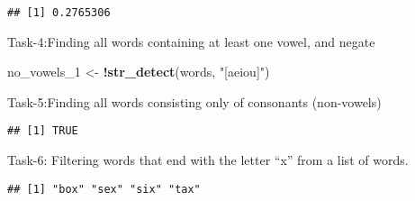 \documentclass[
]{article}
\newenvironment{Shaded}{\begin{snugshade}}{\end{snugshade}}
\newcommand{\FunctionTok}[1]{\textcolor[rgb]{0.13,0.29,0.53}{\textbf{#1}}}
\newcommand{\NormalTok}[1]{#1}
\newcommand{\OtherTok}[1]{\textcolor[rgb]{0.56,0.35,0.01}{#1}}
\newcommand{\SpecialCharTok}[1]{\textcolor[rgb]{0.81,0.36,0.00}{\textbf{#1}}}
\newcommand{\StringTok}[1]{\textcolor[rgb]{0.31,0.60,0.02}{#1}}
\begin{document}
\begin{Shaded}
\end{Shaded}

\begin{verbatim}
## [1] 0.2765306
\end{verbatim}

Task-4:Finding all words containing at least one vowel, and negate

\begin{Shaded}
\begin{Highlighting}[]
\NormalTok{no\_vowels\_1 }\OtherTok{\textless{}{-}} \SpecialCharTok{!}\FunctionTok{str\_detect}\NormalTok{(words, }\StringTok{"[aeiou]"}\NormalTok{)}
\end{Highlighting}
\end{Shaded}

Task-5:Finding all words consisting only of consonants (non-vowels)

\begin{Shaded}
\end{Shaded}

\begin{verbatim}
## [1] TRUE
\end{verbatim}

Task-6: Filtering words that end with the letter ``x'' from a list of
words.

\begin{Shaded}
\end{Shaded}

\begin{verbatim}
## [1] "box" "sex" "six" "tax"
\end{verbatim}

\begin{Shaded}
\end{Shaded}
\end{document}
